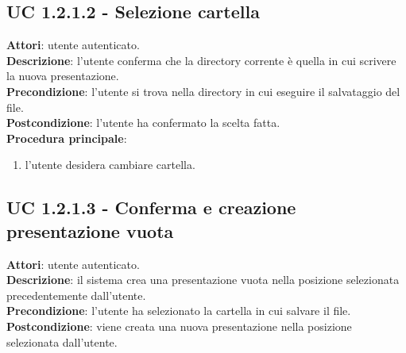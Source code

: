 \subsection{UC 1.2.1.2 - Selezione cartella}{
	\label{uc1.2.1.2}
	\textbf{Attori}: utente autenticato.	\\
	\textbf{Descrizione}: l'utente conferma che la directory corrente è quella in cui scrivere la nuova presentazione.	\\
	\textbf{Precondizione}: l'utente si trova nella directory in cui eseguire il salvataggio del file.	\\
	\textbf{Postcondizione}: l'utente ha confermato la scelta fatta.	\\
	\textbf{Procedura principale}:
	\begin{enumerate}
		\item l'utente desidera cambiare cartella.
	\end{enumerate}	
	}
\subsection{UC 1.2.1.3 - Conferma e creazione presentazione vuota}{
	\label{uc1.2.1.3}
	\textbf{Attori}: utente autenticato.	\\
	\textbf{Descrizione}: il sistema crea una presentazione vuota nella posizione selezionata precedentemente dall'utente.	\\
	\textbf{Precondizione}: l'utente ha selezionato la cartella in cui salvare il file.	\\
	\textbf{Postcondizione}: viene creata una nuova presentazione nella posizione selezionata dall'utente.	\\
	}